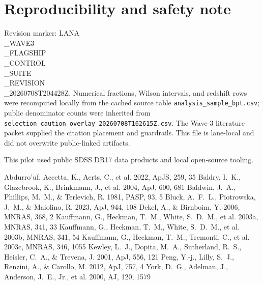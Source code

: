 \documentclass[twocolumn]{aastex631}
\begin{document}
\section*{Reproducibility and safety note}
Revision marker: LANA\\_WAVE3\\_FLAGSHIP\\_CONTROL\\_SUITE\\_REVISION\\_20260708T204428Z.  Numerical fractions, Wilson intervals, and redshift rows were recomputed locally from the cached source table \texttt{analysis\_sample\_bpt.csv}; public denominator counts were inherited from \texttt{selection\_caution\_overlay\_20260708T162615Z.csv}.  The Wave-3 literature packet supplied the citation placement and guardrails.  This file is lane-local and did not overwrite public-linked artifacts.

\acknowledgments
This pilot used public SDSS DR17 data products and local open-source tooling.

\begin{thebibliography}{}
 Abdurro'uf, Accetta, K., Aerts, C., et al. 2022, ApJS, 259, 35
 Baldry, I.~K., Glazebrook, K., Brinkmann, J., et al. 2004, ApJ, 600, 681
 Baldwin, J.~A., Phillips, M.~M., \& Terlevich, R. 1981, PASP, 93, 5
 Bluck, A.~F.~L., Piotrowska, J.~M., \& Maiolino, R. 2023, ApJ, 944, 108
 Dekel, A., \& Birnboim, Y. 2006, MNRAS, 368, 2
 Kauffmann, G., Heckman, T.~M., White, S.~D.~M., et al. 2003a, MNRAS, 341, 33
 Kauffmann, G., Heckman, T.~M., White, S.~D.~M., et al. 2003b, MNRAS, 341, 54
 Kauffmann, G., Heckman, T.~M., Tremonti, C., et al. 2003c, MNRAS, 346, 1055
 Kewley, L.~J., Dopita, M.~A., Sutherland, R.~S., Heisler, C.~A., \& Trevena, J. 2001, ApJ, 556, 121
 Peng, Y.-j., Lilly, S.~J., Renzini, A., \& Carollo, M. 2012, ApJ, 757, 4
 York, D.~G., Adelman, J., Anderson, J.~E., Jr., et al. 2000, AJ, 120, 1579
\end{thebibliography}
\end{document}
